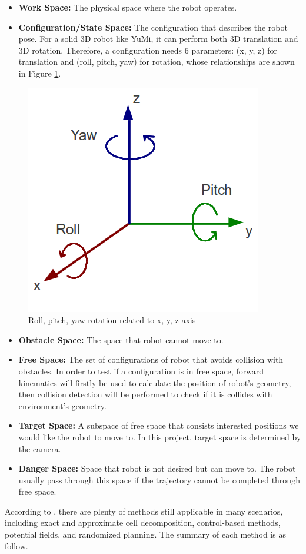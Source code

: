 \begin{itemize}
    \item \textbf{Work Space:} The physical space where the robot operates.
    \item \textbf{Configuration/State Space:} The configuration that describes the robot pose. For a solid 3D robot like YuMi, it can perform both 3D translation and 3D rotation. Therefore, a configuration needs 6 parameters: (x, y, z) for translation and (roll, pitch, yaw) for rotation, whose relationships are shown in Figure \ref{rpy}.
\end{itemize}

\begin{figure}[H]
\centering
\includegraphics[width = 0.4\columnwidth]{background/rpy.png}
\caption{Roll, pitch, yaw rotation related to x, y, z axis}
\label{rpy}
\end{figure}

\begin{itemize}
    \item \textbf{Obstacle Space:} The space that robot cannot move to. 
    \item \textbf{Free Space:} The set of configurations of robot that avoids collision with obstacles. In order to test if a configuration is in free space, forward kinematics will firstly be used to calculate the position of robot's geometry, then collision detection will be performed to check if it is collides with environment's geometry.
    \item \textbf{Target Space:} A subspace of free space that consists interested positions we would like the robot to move to. In this project, target space is determined by the camera.
    \item \textbf{Danger Space:} Space that robot is not desired but can move to. The robot usually pass through this space if the trajectory cannot be completed through free space.
\end{itemize}

According to \citep{OMPLPrim20:online}, there are plenty of methods still applicable in many scenarios, including exact and approximate cell decomposition, control-based methods, potential fields, and randomized planning. The summary of each method is as follow.

